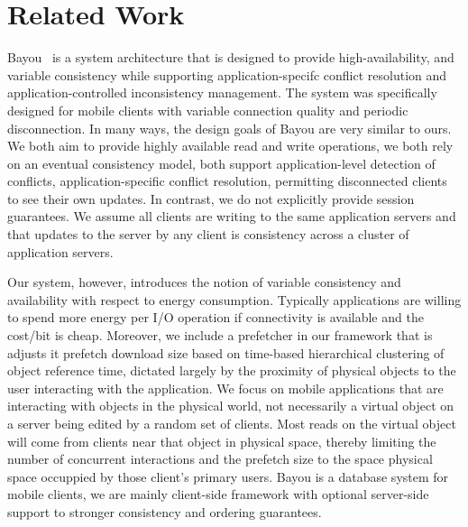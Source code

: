 

\section{Related Work}
Bayou~\cite{bayou} is a system architecture that is designed to provide high-availability,
and variable consistency while supporting application-specifc conflict resolution
and application-controlled inconsistency management.  The system was specifically
designed for mobile clients with variable connection quality and periodic disconnection.
In many ways, the design goals of Bayou are very similar to ours.  We both aim to provide highly 
available read and write operations, we both rely on an eventual consistency model, both support
application-level detection of conflicts, application-specific conflict resolution, permitting
disconnected clients to see their own updates.  In contrast, we do not explicitly provide session
guarantees.  We assume all clients are writing to the same application servers and that updates to the server
by any client is consistency across a cluster of application servers.

Our system, however, introduces the notion of variable consistency and availability with respect
to energy consumption.  Typically applications are willing to spend more energy per I/O operation if 
connectivity is available and the cost/bit is cheap.  Moreover, we include a prefetcher in our framework that
is adjusts it prefetch download size based on time-based hierarchical clustering of object reference time, dictated
largely by the proximity of physical objects to the user interacting with the application.  We focus on
mobile applications that are interacting with objects in the physical world, not necessarily a virtual
object on a server being edited by a random set of clients.  Most reads on the virtual object
will come from clients near that object in physical space, thereby limiting the number of concurrent
interactions and the prefetch size to the space physical space occuppied by those client's primary users.
Bayou is a database system for mobile clients, we are mainly client-side framework with optional server-side
support to stronger consistency and ordering guarantees.



